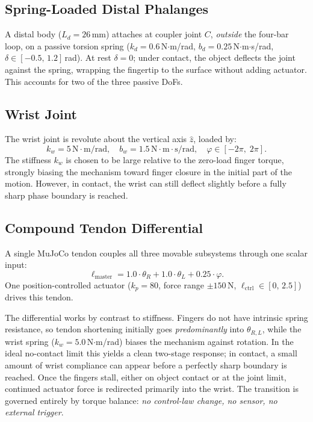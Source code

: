 \documentclass[10pt,twocolumn]{article}
\begin{document}
\subsection{Spring-Loaded Distal Phalanges}
A distal body ($L_d = 26$\,mm) attaches at coupler joint $C$, \emph{outside} the four-bar loop, on a passive torsion spring ($k_d = 0.6$\,N$\cdot$m/rad, $b_d = 0.25$\,N$\cdot$m$\cdot$s/rad, $\delta \in [-0.5,\,1.2]$\,rad). At rest $\delta = 0$; under contact, the object deflects the joint against the spring, wrapping the fingertip to the surface without adding actuator. This accounts for two of the three passive DoFs.

\subsection{Wrist Joint}
The wrist joint is revolute about the vertical axis $\hat{z}$, loaded by:
\begin{equation}
  k_w = 5\,\text{N} \cdot \text{m/rad}, \quad b_w = 1.5\,\text{N} \cdot \text{m} \cdot \text{s/rad}, \quad \varphi \in [-2\pi,\; 2\pi].
  \label{eq:wrist_spring}
\end{equation}
The stiffness $k_w$ is chosen to be large relative to the zero-load finger torque, strongly biasing the mechanism toward finger closure in the initial part of the motion. However, in contact, the wrist can still deflect slightly before a fully sharp phase boundary is reached. %

\subsection{Compound Tendon Differential}
A single MuJoCo tendon couples all three movable subsystems through one scalar input:
\begin{equation}
  \ell_\text{master} = 1.0\cdot\theta_R + 1.0\cdot\theta_L
  + 0.25\cdot\varphi.
  \label{eq:tendon}
\end{equation}
One position-controlled actuator ($k_p = 80$, force range $\pm 150$\,N, $\ell_\text{ctrl} \in [0,\,2.5]$) drives this tendon.

The differential works by contrast to stiffness. Fingers do not have intrinsic spring resistance, so tendon shortening initially goes \emph{predominantly} into $\theta_{R,L}$, while the wrist spring ($k_w = 5.0$\,N$\cdot$m/rad) biases the mechanism against rotation. In the ideal no-contact limit this yields a clean two-stage response; in contact, a small amount of wrist compliance can appear before a perfectly sharp boundary is reached. Once the fingers stall, either on object contact or at the joint limit, continued actuator force is redirected primarily into the wrist. The transition is governed entirely by torque balance: \emph{no control-law change, no sensor, no external trigger}.
\end{document}

